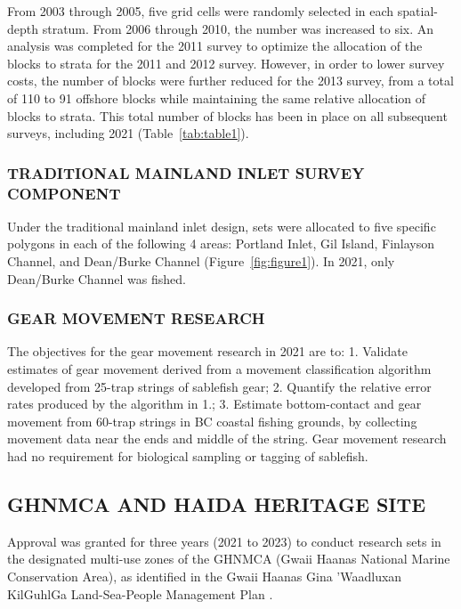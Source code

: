 \documentclass[12pt]{article}\usepackage[]{graphicx}\usepackage[]{color}
\begin{document}
From 2003 through 2005, five grid cells were randomly selected in each spatial-depth stratum. From 2006 through 2010, the number was increased to six. An analysis was completed for the 2011 survey to optimize the allocation of the blocks to strata for the 2011 and 2012 survey. However, in order to lower survey costs, the number of blocks were further reduced for the 2013 survey, from a total of 110 to 91 offshore blocks while maintaining the same relative allocation of blocks to strata. This total number of blocks has been in place on all subsequent surveys, including 2021 (Table~\ref{tab:table1}).

\hypertarget{traditional-mainland-inlet-survey-component}{%
\subsubsection{TRADITIONAL MAINLAND INLET SURVEY COMPONENT}\label{traditional-mainland-inlet-survey-component}}

Under the traditional mainland inlet design, sets were allocated to five specific polygons in each of the following 4 areas: Portland Inlet, Gil Island, Finlayson Channel, and Dean/Burke Channel (Figure~\ref{fig:figure1}). In 2021, only Dean/Burke Channel was fished.

\hypertarget{gear-movement-research}{%
\subsubsection{GEAR MOVEMENT RESEARCH}\label{gear-movement-research}}

The objectives for the gear movement research in 2021 are to: 1. Validate estimates of gear movement derived from a movement classification algorithm developed from 25-trap strings of sablefish gear; 2. Quantify the relative error rates produced by the algorithm in 1.; 3. Estimate bottom-contact and gear movement from 60-trap strings in BC coastal fishing grounds, by collecting movement data near the ends and middle of the string. Gear movement research had no requirement for biological sampling or tagging of sablefish.

\hypertarget{ghnmca-and-haida-heritage-site}{%
\subsection{GHNMCA AND HAIDA HERITAGE SITE}\label{ghnmca-and-haida-heritage-site}}

Approval was granted for three years (2021 to 2023) to conduct research sets in the designated multi-use zones of the GHNMCA (Gwaii Haanas National Marine Conservation Area), as identified in the Gwaii Haanas Gina 'Waadluxan KilGuhlGa Land-Sea-People Management Plan .
\end{document}

